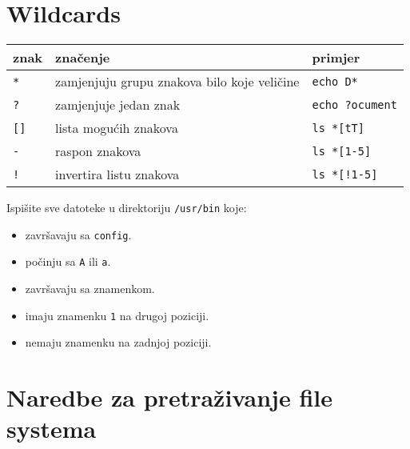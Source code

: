 \section*{Wildcards}
\begin{center}
\begin{tabular}{lll}
\toprule
znak & značenje & primjer\\
\midrule
\texttt{*} & zamjenjuju grupu znakova bilo koje veličine& \texttt{echo D*}\\
\texttt{?} & zamjenjuje jedan znak&\texttt{echo ?ocument}\\
\texttt{[]} & lista mogućih znakova&\texttt{ls *[tT]}\\ 
\texttt{-} & raspon znakova &\texttt{ls *[1-5]}\\
\texttt{!} &invertira listu znakova&\texttt{ls *[!1-5]}\\
\bottomrule
\end{tabular}
\end{center}
\begin{zadatak} Ispišite sve datoteke u direktoriju \texttt{/usr/bin} koje:
\begin{itemize}
 \item završavaju sa \texttt{config}.
 \item počinju sa \texttt{A} ili \texttt{a}.
 \item završavaju sa znamenkom.
 \item imaju znamenku \texttt{1} na drugoj poziciji.
 \item nemaju znamenku na zadnjoj poziciji.
 \end{itemize}
\end{zadatak}

 \section*{Naredbe za pretraživanje file systema}
